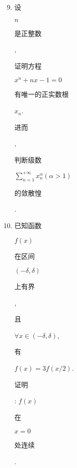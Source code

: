 \documentclass[10pt]{article}
\begin{document}
\begin{enumerate}
  \setcounter{enumi}{8}
  \item \begin{CJK}{UTF8}{mj}设\end{CJK} $n$ \begin{CJK}{UTF8}{mj}是正整数\end{CJK},\begin{CJK}{UTF8}{mj}证明方程\end{CJK} $x^{n}+n x-1=0$ \begin{CJK}{UTF8}{mj}有唯一的正实数根\end{CJK} $x_{n}$. \begin{CJK}{UTF8}{mj}进而\end{CJK}, \begin{CJK}{UTF8}{mj}判断级数\end{CJK} $\sum_{n=1}^{+\infty} x_{n}^{\alpha}(\alpha>1)$ \begin{CJK}{UTF8}{mj}的敛散惶\end{CJK}.

  \item \begin{CJK}{UTF8}{mj}已知函数\end{CJK} $f(x)$ \begin{CJK}{UTF8}{mj}在区间\end{CJK} $(-\delta, \delta)$ \begin{CJK}{UTF8}{mj}上有界\end{CJK}, \begin{CJK}{UTF8}{mj}且\end{CJK} $\forall x \in(-\delta, \delta)$, \begin{CJK}{UTF8}{mj}有\end{CJK} $f(x)=3 f(x / 2)$. \begin{CJK}{UTF8}{mj}证明\end{CJK}: $f(x)$ \begin{CJK}{UTF8}{mj}在\end{CJK} $x=0$ \begin{CJK}{UTF8}{mj}处连续\end{CJK}.


\end{enumerate}
\end{document}
